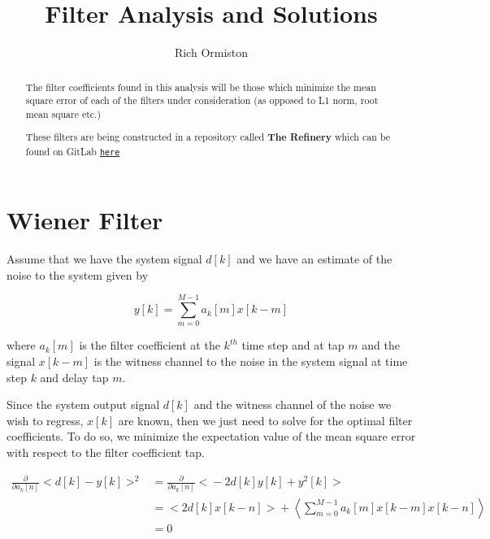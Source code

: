 \documentclass{article}
\title{Filter Analysis and Solutions}
\author{Rich Ormiston}
\date{\date}
\begin{document}
\maketitle

\renewcommand{\abstractname}{Note About the Analysis}
\begin{abstract}
The filter coefficients found in this analysis will be those which minimize the
mean square error of each of the filters under consideration (as opposed to L1
norm, root mean square etc.)

\vspace{1em}
\noindent These filters are being constructed in a repository called \textbf{The
Refinery} which can be found on GitLab
\href{https://git.ligo.org/rich.ormiston/refinery}{\texttt{here}}
\end{abstract}


\section{Wiener Filter}
Assume that we have the system signal $d[k]$ and we have an estimate of the
noise to the system given by 

\begin{equation}
    y[k] = \sum_{m=0}^{M-1} a_k[m]x[k-m]
\end{equation}

where $a_k[m]$ is the filter coefficient at the $k^{th}$ time step and at tap $m$
and the signal $x[k-m]$ is the witness channel to the noise in the system signal
at time step $k$ and delay tap $m$.

Since the system output signal $d[k]$ and the witness channel of the noise we wish
to regress, $x[k]$ are known, then we just need to solve for the optimal filter
coefficients. To do so, we minimize the expectation value of the mean square error
with respect to the filter coefficient tap.

\begin{align}
    \frac{\partial}{\partial a_k[n]} \big<d[k] - y[k]\big>^2 &=
    \frac{\partial}{\partial a_k[n]} \big<-2d[k]y[k] + y^2[k]\big>\\
    &= \bigg<2d[k]x[k-n]\bigg> + \left<\sum_{m=0}^{M-1} a_k[m]x[k-m] x[k-n]\right>\\
    &= 0
\end{align}
\end{document}
